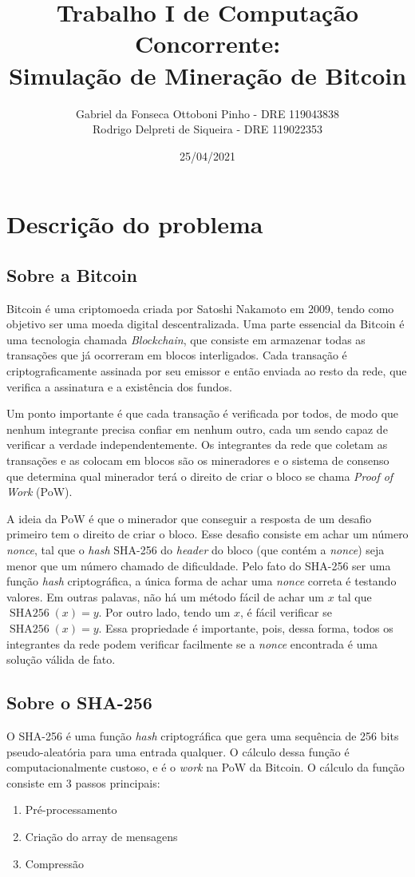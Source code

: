 \documentclass[12pt]{article}
\author{Gabriel da Fonseca Ottoboni Pinho - DRE 119043838\\
Rodrigo Delpreti de Siqueira - DRE 119022353}
\title{Trabalho I de Computação Concorrente: \\Simulação de Mineração de Bitcoin}
\date{25/04/2021}
\DeclareMathOperator{\sha}{SHA256}
\begin{document}
\maketitle
\newpage
\tableofcontents
\newpage

\section{Descrição do problema}
\subsection{Sobre a Bitcoin}
Bitcoin é uma criptomoeda criada por Satoshi Nakamoto em 2009,
tendo como objetivo ser uma moeda digital descentralizada.
Uma parte essencial da Bitcoin é uma tecnologia chamada \textit{Blockchain},
que consiste em armazenar todas as transações que já ocorreram
em blocos interligados.
Cada transação é criptograficamente assinada por seu emissor
e então enviada ao resto da rede,
que verifica a assinatura e a existência dos fundos.

Um ponto importante é que cada transação é verificada por todos,
de modo que nenhum integrante precisa confiar em nenhum outro,
cada um sendo capaz de verificar a verdade independentemente.
Os integrantes da rede que coletam as transações
e as colocam em blocos são os mineradores
e o sistema de consenso que determina qual minerador
terá o direito de criar o bloco se chama \textit{Proof of Work} (PoW).

A ideia da PoW é que o minerador que conseguir
a resposta de um desafio primeiro
tem o direito de criar o bloco.
Esse desafio consiste em achar um número \textit{nonce},
tal que o \textit{hash} SHA-256 do \textit{header} do bloco
(que contém a \textit{nonce})
seja menor que um número chamado de dificuldade.
Pelo fato do SHA-256 ser uma função \textit{hash} criptográfica,
a única forma de achar uma \textit{nonce} correta é
testando valores.
Em outras palavas, não há um método fácil de achar
um $x$ tal que $\sha(x) = y$.
Por outro lado, tendo um $x$,
é fácil verificar se $\sha(x) = y$.
Essa propriedade é importante,
pois, dessa forma, todos os integrantes da rede podem
verificar facilmente se a \textit{nonce} encontrada
é uma solução válida de fato.

\subsection{Sobre o SHA-256}
O SHA-256 é uma função \textit{hash} criptográfica
que gera uma sequência de 256 bits pseudo-aleatória
para uma entrada qualquer.
O cálculo dessa função é computacionalmente custoso,
e é o \textit{work} na PoW da Bitcoin.
O cálculo da função consiste em 3 passos principais:
\begin{enumerate}
	\item Pré-processamento
	\item Criação do array de mensagens
	\item Compressão
\end{enumerate}
\end{document}
